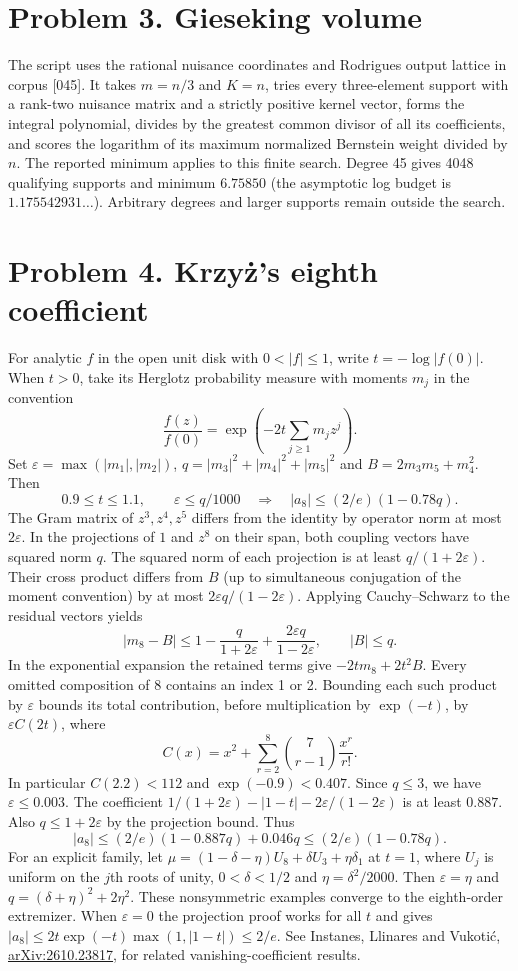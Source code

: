 \documentclass[11pt,a4paper]{article}
\begin{document}
\section{Problem 3. Gieseking volume}
The script uses the rational nuisance coordinates and Rodrigues output lattice in corpus [045]. It takes $m=n/3$ and $K=n$, tries every three-element support with a rank-two nuisance matrix and a strictly positive kernel vector, forms the integral polynomial, divides by the greatest common divisor of all its coefficients, and scores the logarithm of its maximum normalized Bernstein weight divided by $n$. The reported minimum applies to this finite search. Degree 45 gives 4048 qualifying supports and minimum $6.75850$ (the asymptotic log budget is $1.175542931\ldots$). Arbitrary degrees and larger supports remain outside the search.

\section{Problem 4. Krzy\.{z}'s eighth coefficient}
For analytic $f$ in the open unit disk with $0<|f|\le1$, write $t=-\log|f(0)|$. When $t>0$, take its Herglotz probability measure with moments $m_j$ in the convention
\[
 \frac{f(z)}{f(0)}=\exp\!\left(-2t\sum_{j\ge1}m_jz^j\right).
\]
Set $\varepsilon=\max(|m_1|,|m_2|)$, $q=|m_3|^2+|m_4|^2+|m_5|^2$ and $B=2m_3m_5+m_4^2$. Then
\[
 0.9\le t\le1.1,\qquad \varepsilon\le q/1000
 \quad\Longrightarrow\quad |a_8|\le(2/e)(1-0.78q).
\]
The Gram matrix of $z^3,z^4,z^5$ differs from the identity by operator norm at most $2\varepsilon$. In the projections of $1$ and $z^8$ on their span, both coupling vectors have squared norm $q$. The squared norm of each projection is at least $q/(1+2\varepsilon)$. Their cross product differs from $B$ (up to simultaneous conjugation of the moment convention) by at most $2\varepsilon q/(1-2\varepsilon)$. Applying Cauchy--Schwarz to the residual vectors yields
\[
 |m_8-B|\le1-\frac{q}{1+2\varepsilon}
            +\frac{2\varepsilon q}{1-2\varepsilon},
 \qquad |B|\le q .
\]
In the exponential expansion the retained terms give $-2t m_8+2t^2B$. Every omitted composition of 8 contains an index 1 or 2. Bounding each such product by $\varepsilon$ bounds its total contribution, before multiplication by $\exp(-t)$, by $\varepsilon C(2t)$, where
\[
 C(x)=x^2+\sum_{r=2}^8\binom7{r-1}\frac{x^r}{r!}.
\]
In particular $C(2.2)<112$ and $\exp(-0.9)<0.407$. Since $q\le3$, we have $\varepsilon\le0.003$. The coefficient $1/(1+2\varepsilon)-|1-t|-2\varepsilon/(1-2\varepsilon)$ is at least $0.887$. Also $q\le1+2\varepsilon$ by the projection bound. Thus
\[
 |a_8|\le (2/e)(1-0.887q)+0.046q\le(2/e)(1-0.78q).
\]
For an explicit family, let $\mu=(1-\delta-\eta)U_8+\delta U_3+\eta\delta_1$ at $t=1$, where $U_j$ is uniform on the $j$th roots of unity, $0<\delta<1/2$ and $\eta=\delta^2/2000$. Then $\varepsilon=\eta$ and $q=(\delta+\eta)^2+2\eta^2$. These nonsymmetric examples converge to the eighth-order extremizer. When $\varepsilon=0$ the projection proof works for all $t$ and gives $|a_8|\le2t\exp(-t)\max(1,|1-t|)\le2/e$. See Instanes, Llinares and Vukoti\'c, \href{https://arxiv.org/abs/2610.23817}{arXiv:2610.23817}, for related vanishing-coefficient results.
\end{document}
